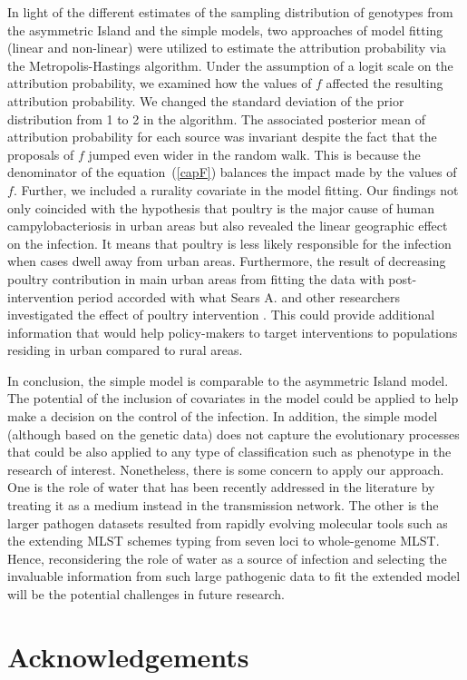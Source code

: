 \documentclass[times, doublespace]{simauth}%
\begin{document}
In light of the different estimates of the sampling distribution of genotypes from the asymmetric Island and the simple models, two approaches of model fitting (linear and non-linear) were utilized to estimate the attribution probability via the Metropolis-Hastings algorithm. Under the assumption of a logit scale on the attribution probability, we examined how the values of $f$ affected the resulting attribution probability. We changed the standard deviation of the prior distribution from 1 to 2 in the algorithm. The associated posterior mean of attribution probability for each source was invariant despite the fact that the proposals of $f$ jumped even wider in the random walk. This is because the denominator of the equation~(\ref{capF}) balances the impact made by the values of $f$. Further, we included a rurality covariate in the model fitting. Our findings not only coincided with the hypothesis that poultry is the major cause of human campylobacteriosis in urban areas \cite{MullA, Marsh, MullM, Leve} but also revealed the linear geographic effect on the infection. It means that poultry is less likely responsible for the infection when cases dwell away from urban areas. Furthermore, the result of decreasing poultry contribution in main urban areas from fitting the data with post-intervention period accorded with what Sears A. and other researchers investigated the effect of poultry intervention \cite{AnnS}. This could provide additional information that would help policy-makers to target interventions to populations residing in urban compared to rural areas.

In conclusion, the simple model is comparable to the asymmetric Island model. The potential of the inclusion of covariates in the model could be applied to help make a decision on the control of the infection. In addition, the simple model (although based on the genetic data) does not capture the evolutionary processes that could be also applied to any type of classification such as phenotype in the research of interest. Nonetheless, there is some concern to apply our approach. One is the role of water that has been recently addressed in the literature \cite{Wagen} by treating it as a medium instead in the transmission network. The other is the larger pathogen datasets resulted from rapidly evolving molecular tools such as the extending MLST schemes typing from seven loci to whole-genome MLST. Hence, reconsidering the role of water as a source of infection and selecting the invaluable information from such large pathogenic data to fit the extended model will be the potential challenges in future research.

\section*{Acknowledgements}


\end{document}
